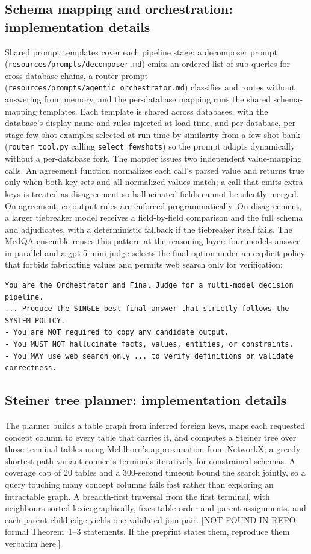 \subsection*{Schema mapping and orchestration: implementation details}

Shared prompt templates cover each pipeline stage: a decomposer prompt (\texttt{resources/prompts/decomposer.md}) emits an ordered list of sub-queries for cross-database chains, a router prompt (\texttt{resources/prompts/agentic\_orchestrator.md}) classifies and routes without answering from memory, and the per-database mapping runs the shared schema-mapping templates. Each template is shared across databases, with the database's display name and rules injected at load time, and per-database, per-stage few-shot examples selected at run time by similarity from a few-shot bank (\texttt{router\_tool.py} calling \texttt{select\_fewshots}) so the prompt adapts dynamically without a per-database fork. The mapper issues two independent value-mapping calls. An agreement function normalizes each call's parsed value and returns true only when both key sets and all normalized values match; a call that emits extra keys is treated as disagreement so hallucinated fields cannot be silently merged. On agreement, co-output rules are enforced programmatically. On disagreement, a larger tiebreaker model receives a field-by-field comparison and the full schema and adjudicates, with a deterministic fallback if the tiebreaker itself fails. The MedQA ensemble reuses this pattern at the reasoning layer: four models answer in parallel and a gpt-5-mini judge selects the final option under an explicit policy that forbids fabricating values and permits web search only for verification:
\begin{verbatim}
You are the Orchestrator and Final Judge for a multi-model decision pipeline.
... Produce the SINGLE best final answer that strictly follows the SYSTEM POLICY.
- You are NOT required to copy any candidate output.
- You MUST NOT hallucinate facts, values, entities, or constraints.
- You MAY use web_search only ... to verify definitions or validate correctness.
\end{verbatim}

\subsection*{Steiner tree planner: implementation details}

The planner builds a table graph from inferred foreign keys, maps each requested concept column to every table that carries it, and computes a Steiner tree over those terminal tables using Mehlhorn's approximation from NetworkX; a greedy shortest-path variant connects terminals iteratively for constrained schemas. A coverage cap of $20$ tables and a $300$-second timeout bound the search jointly, so a query touching many concept columns fails fast rather than exploring an intractable graph. A breadth-first traversal from the first terminal, with neighbours sorted lexicographically, fixes table order and parent assignments, and each parent-child edge yields one validated join pair. [NOT FOUND IN REPO: formal Theorem~1--3 statements. If the preprint states them, reproduce them verbatim here.]

